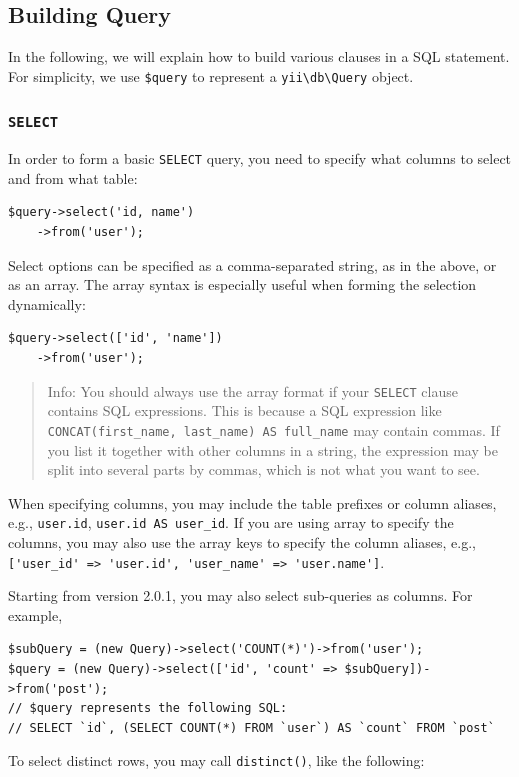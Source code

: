 \subsection{Building Query}
In the following, we will explain how to build various clauses in a SQL statement. For simplicity,
we use \lstinline|$query| to represent a \texttt{yii{\allowbreak{}\textbackslash}db{\allowbreak{}\textbackslash}Query} object.

\subsubsection{\lstinline|SELECT|}
In order to form a basic \lstinline|SELECT| query, you need to specify what columns to select and from what table:

\lstset{language=php}\begin{lstlisting}
$query->select('id, name')
    ->from('user');
\end{lstlisting}
Select options can be specified as a comma-separated string, as in the above, or as an array.
The array syntax is especially useful when forming the selection dynamically:

\lstset{language=php}\begin{lstlisting}
$query->select(['id', 'name'])
    ->from('user');
\end{lstlisting}
\begin{quote}Info: You should always use the array format if your \lstinline|SELECT| clause contains SQL expressions.
This is because a SQL expression like \lstinline|CONCAT(first_name, last_name) AS full_name| may contain commas.
If you list it together with other columns in a string, the expression may be split into several parts
by commas, which is not what you want to see.

\end{quote}
When specifying columns, you may include the table prefixes or column aliases, e.g., \lstinline|user.id|, \lstinline|user.id AS user_id|.
If you are using array to specify the columns, you may also use the array keys to specify the column aliases,
e.g., \lstinline|['user_id' => 'user.id', 'user_name' => 'user.name']|.

Starting from version 2.0.1, you may also select sub-queries as columns. For example,

\lstset{language=php}\begin{lstlisting}
$subQuery = (new Query)->select('COUNT(*)')->from('user');
$query = (new Query)->select(['id', 'count' => $subQuery])->from('post');
// $query represents the following SQL:
// SELECT `id`, (SELECT COUNT(*) FROM `user`) AS `count` FROM `post`
\end{lstlisting}
To select distinct rows, you may call \lstinline|distinct()|, like the following:

